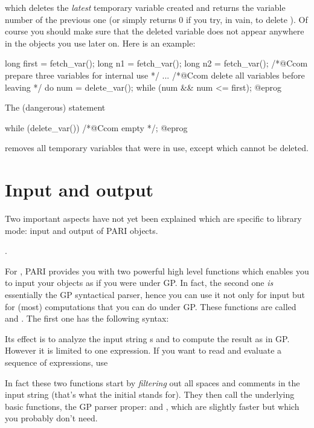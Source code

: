 
\noindent which deletes the {\it latest\/} temporary variable created and
returns the variable number of the previous one (or simply returns 0 if you
try, in vain, to delete ). Of course you should make sure that
the deleted variable does not appear anywhere in the objects you use later
on. Here is an example:

\bprog
{
  long first = fetch_var();
  long n1 = fetch_var();
  long n2 = fetch_var(); /*@Ccom prepare three variables for internal use */
  ...
  /*@Ccom delete all variables before leaving */
  do { num = delete_var(); } while (num && num <= first);
}@eprog

\noindent
The (dangerous) statement

\bprog
while (delete_var()) /*@Ccom empty */;
@eprog

\noindent removes all temporary variables that were in use, except
 which cannot be deleted.

\section{Input and output}

\noindent
Two important aspects have not yet been explained which are specific to
library mode: input and output of PARI objects.

.

\noindent
For , PARI provides you with two powerful high level functions
which enables you to input your objects as if you were under GP. In fact,
the second one {\it is\/} essentially the GP syntactical parser, hence you
can use it not only for input but for (most) computations that you can do
under GP. These functions are called  and . The
first one has the following syntax:\label{se:flisexpr}


\noindent
Its effect is to analyze the input string s and to compute the result as in
GP.  However it is limited to one expression. If you want to read and
evaluate a sequence of expressions, use


\noindent{}
In fact these two functions start by {\it filtering\/} out all spaces and
comments in the input string (that's what the initial  stands for).
They then call the underlying basic functions, the GP parser proper:
 and , which are
slightly faster but which you probably don't need.

